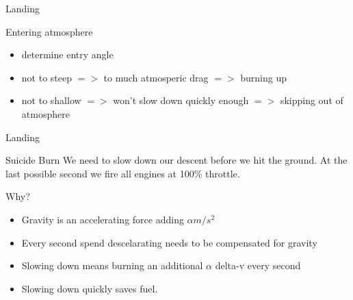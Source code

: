 {
%
\begin{frame}
\end{frame}
\begin{frame}[t]{Landing}
    \begin{block}{Entering atmosphere}
        \begin{itemize}
            \item determine entry angle
            \item not to steep $=>$ to much atmosperic drag $=>$ burning up
            \item not to shallow $=>$ won't slow down quickly enough $=>$ skipping out of atmosphere
        \end{itemize}
    \end{block}
\end{frame}
\begin{frame}[t]{Landing}
    \begin{block}{Suicide Burn}
        We need to slow down our descent before we hit the ground. At the last possible second we fire all engines at 100\% throttle.
    \end{block}
    \begin{block}{Why?}
        \begin{itemize}
            \item Gravity is an accelerating force adding $\alpha m/s^2$
            \item Every second spend descelarating needs to be compensated for gravity
            \item Slowing down means burning an additional $\alpha$ delta-v every second
            \item Slowing down quickly saves fuel.
        \end{itemize}
    \end{block}
\end{frame}
}
